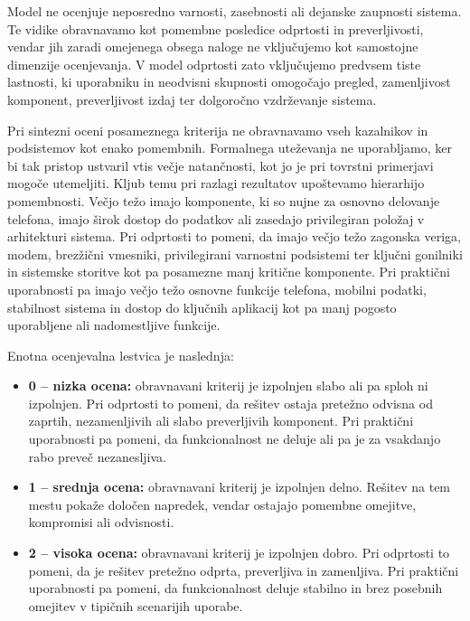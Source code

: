 \documentclass[a4paper,12pt,openright]{book}
\begin{document}
Model ne ocenjuje neposredno varnosti, zasebnosti ali dejanske zaupnosti sistema.
Te vidike obravnavamo kot pomembne posledice odprtosti in preverljivosti, vendar jih zaradi omejenega obsega naloge ne vključujemo kot samostojne dimenzije ocenjevanja.
V model odprtosti zato vključujemo predvsem tiste lastnosti, ki uporabniku in neodvisni skupnosti omogočajo pregled, zamenljivost komponent, preverljivost izdaj ter dolgoročno vzdrževanje sistema.

Pri sintezni oceni posameznega kriterija ne obravnavamo vseh kazalnikov in podsistemov kot enako pomembnih.
Formalnega uteževanja ne uporabljamo, ker bi tak pristop ustvaril vtis večje natančnosti, kot jo je pri tovrstni primerjavi mogoče utemeljiti.
Kljub temu pri razlagi rezultatov upoštevamo hierarhijo pomembnosti.
Večjo težo imajo komponente, ki so nujne za osnovno delovanje telefona, imajo širok dostop do podatkov ali zasedajo privilegiran položaj v arhitekturi sistema.
Pri odprtosti to pomeni, da imajo večjo težo zagonska veriga, modem, brezžični vmesniki, privilegirani varnostni podsistemi ter ključni gonilniki in sistemske storitve kot pa posamezne manj kritične komponente.
Pri praktični uporabnosti pa imajo večjo težo osnovne funkcije telefona, mobilni podatki, stabilnost sistema in dostop do ključnih aplikacij kot pa manj pogosto uporabljene ali nadomestljive funkcije.

Enotna ocenjevalna lestvica je naslednja:
\begin{itemize}
  \item \textbf{0 -- nizka ocena:} obravnavani kriterij je izpolnjen slabo ali pa sploh ni izpolnjen.
  Pri odprtosti to pomeni, da rešitev ostaja pretežno odvisna od zaprtih, nezamenljivih ali slabo preverljivih komponent.
  Pri praktični uporabnosti pa pomeni, da funkcionalnost ne deluje ali pa je za vsakdanjo rabo preveč nezanesljiva.

  \item \textbf{1 -- srednja ocena:} obravnavani kriterij je izpolnjen delno.
  Rešitev na tem mestu pokaže določen napredek, vendar ostajajo pomembne omejitve, kompromisi ali odvisnosti.

  \item \textbf{2 -- visoka ocena:} obravnavani kriterij je izpolnjen dobro.
  Pri odprtosti to pomeni, da je rešitev pretežno odprta, preverljiva in zamenljiva.
  Pri praktični uporabnosti pa pomeni, da funkcionalnost deluje stabilno in brez posebnih omejitev v tipičnih scenarijih uporabe.
\end{itemize}
\end{document}
